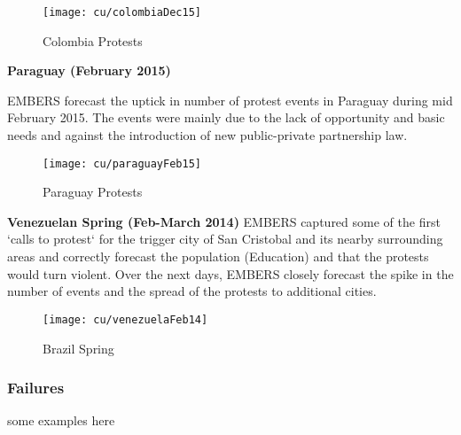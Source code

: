 \begin{figure}[H]
\texttt{[image: cu/colombiaDec15]}
\caption{Colombia Protests}
\label{fig:colombiaDec14}
\end{figure}

\textbf{Paraguay (February 2015)}

EMBERS forecast the uptick in number of protest events in Paraguay during mid
February 2015. The events were mainly due to the lack of opportunity and basic
needs and against the introduction of new public-private partnership law.

\begin{figure}[H]
\texttt{[image: cu/paraguayFeb15]}
\caption{Paraguay Protests}
\label{fig:paraguay15}
\end{figure}

\textbf{Venezuelan Spring (Feb-March 2014)}
EMBERS captured some of the first `calls to protest` for the trigger city of
San Cristobal and its nearby surrounding areas and correctly forecast the
population (Education) and that the protests would turn violent. Over the next
days, EMBERS closely forecast the spike in the number of events and the spread
of the protests to additional cities.

\begin{figure}[H]
\texttt{[image: cu/venezuelaFeb14]}
\caption{Brazil Spring}
\label{fig:brazilSpring}
\end{figure}

\subsubsection{Failures}

some examples here
